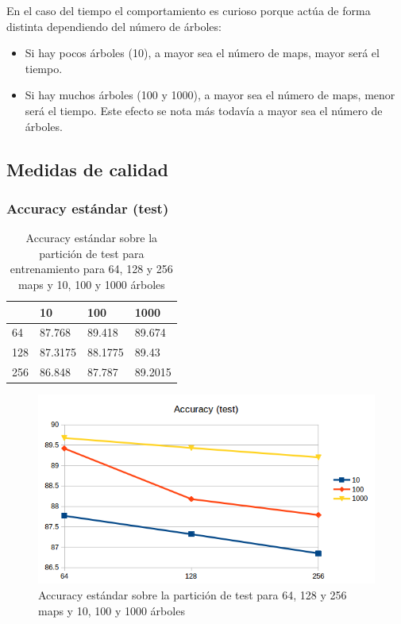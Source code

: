 En el caso del tiempo el comportamiento es curioso porque actúa de forma distinta dependiendo del número de árboles:
\begin{itemize}
	\item Si hay pocos árboles (10), a mayor sea el número de maps, mayor será el tiempo.
	\item Si hay muchos árboles (100 y 1000), a mayor sea el número de maps, menor será el tiempo. Este efecto se nota más todavía a mayor sea el número de árboles.
\end{itemize}

\newpage
\subsection{Medidas de calidad}

\subsubsection{Accuracy estándar (test)}

\begin{table}[H]
	\centering
	\caption{Accuracy estándar sobre la partición de test para entrenamiento para 64, 128 y 256 maps y 10, 100 y 1000 árboles}
	\label{tab:accuracy-test}
	\begin{tabular}{l|lll|}
		\cline{2-4}
		& 10    & 100    & 1000    \\ \hline
		\multicolumn{1}{|l|}{64}  & 87.768  & 89.418  & 89.674  \\
		\multicolumn{1}{|l|}{128} & 87.3175 & 88.1775 & 89.43   \\
		\multicolumn{1}{|l|}{256} & 86.848  & 87.787  & 89.2015 \\ \hline
	\end{tabular}
\end{table}

\begin{figure}[H]
	\centering
	\includegraphics[width=12cm]{img/accuracy-test}
	\caption{Accuracy estándar sobre la partición de test para 64, 128 y 256 maps y 10, 100 y 1000 árboles}
	\label{fig:accuracy-test}
\end{figure}

